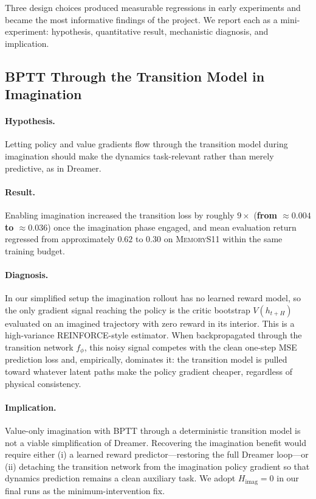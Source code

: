 \documentclass[letterpaper]{article}
\begin{document}
Three design choices produced measurable regressions in early experiments
and became the most informative findings of the project. We report each
as a mini-experiment: hypothesis, quantitative result, mechanistic
diagnosis, and implication.

\subsection{BPTT Through the Transition Model in Imagination}

\paragraph{Hypothesis.} Letting policy and value gradients flow through the
transition model during imagination should make the dynamics task-relevant
rather than merely predictive, as in Dreamer.

\paragraph{Result.} Enabling imagination increased the transition loss by
roughly $9\times$ (\textbf{from $\approx 0.004$ to $\approx 0.036$}) once
the imagination phase engaged, and mean evaluation return regressed from
approximately $0.62$ to $0.30$ on \textsc{MemoryS11} within the same
training budget.

\paragraph{Diagnosis.} In our simplified setup the imagination rollout has
no learned reward model, so the only gradient signal reaching the policy
is the critic bootstrap $V(h_{t+H})$ evaluated on an imagined trajectory
with zero reward in its interior. This is a high-variance REINFORCE-style
estimator. When backpropagated through the transition network $f_\phi$,
this noisy signal competes with the clean one-step MSE prediction loss
and, empirically, dominates it: the transition model is pulled toward
whatever latent paths make the policy gradient cheaper, regardless of
physical consistency.

\paragraph{Implication.} Value-only imagination with BPTT through a
deterministic transition model is not a viable simplification of Dreamer.
Recovering the imagination benefit would require either (i) a learned
reward predictor---restoring the full Dreamer loop---or (ii) detaching the
transition network from the imagination policy gradient so that dynamics
prediction remains a clean auxiliary task. We adopt $H_\text{imag}\!=\!0$
in our final runs as the minimum-intervention fix.
\end{document}
